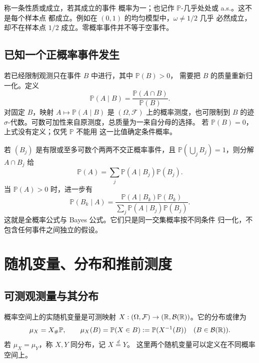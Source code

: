 称一条性质或成立，若其成立的事件
概率为一；也记作 \(\mathbb P\)-几乎处处或 a.s.。这不是每个样本点
都成立。例如在 \((0,1)\) 的均匀模型中，\(\omega\ne1/2\) 几乎
必然成立，却不在样本点 \(1/2\) 成立。零概率事件并不等于空事件。

\subsection{已知一个正概率事件发生}

若已经限制观测只在事件 \(B\) 中进行，其中 \(\mathbb P(B)>0\)，
需要把 \(B\) 的质量重新归一化。定义
\begin{equation}\label{eq:conditional-event-probability}
 \mathbb P(A\mid B)=\frac{\mathbb P(A\cap B)}{\mathbb P(B)}.
\end{equation}
对固定 \(B\)，映射 \(A\mapsto\mathbb P(A\mid B)\) 是
\((\Omega,\mathcal F)\) 上的概率测度，也可限制到 \(B\) 的迹
\(\sigma\)-代数。可数可加性来自原测度，总质量为一来自分母的选择。
若 \(\mathbb P(B)=0\)，上式没有定义；仅凭 \(\mathbb P\) 不能用
这一比值确定条件概率。

若 \((B_j)\) 是有限或至多可数个两两不交正概率事件，且
\(\mathbb P(\bigcup_jB_j)=1\)，则分解 \(A\cap B_j\) 给
\begin{equation}\label{eq:probability-total-bayes}
 \mathbb P(A)=\sum_j\mathbb P(A\mid B_j)\mathbb P(B_j).
\end{equation}
当 \(\mathbb P(A)>0\) 时，进一步有
\[
 \mathbb P(B_k\mid A)
 =\frac{\mathbb P(A\mid B_k)\mathbb P(B_k)}
        {\sum_j\mathbb P(A\mid B_j)\mathbb P(B_j)}.
\]
这就是全概率公式与 Bayes 公式。它们只是同一交集概率按不同条件
归一化，不包含任何事件之间独立的假设。

\section{随机变量、分布和推前测度}
\label{sec:random-variables-laws}

\subsection{可测观测量与其分布}

\begin{definition}\label{def:random-variable-law}
概率空间上的实随机变量是可测映射
\(X:(\Omega,\mathcal F)\to(\mathbb{R},\mathcal B(\mathbb{R}))\)。它的分布或律为
\[
 \mu_X=X_\#\mathbb P,\qquad
 \mu_X(B)=\mathbb P(X\in B):=\mathbb P(X^{-1}(B))
 \quad(B\in\mathcal B(\mathbb{R})).
\]
若 \(\mu_X=\mu_Y\)，称 \(X,Y\) 同分布，记 \(X\overset d=Y\)。
这里两个随机变量可以定义在不同概率空间上。
\end{definition}

